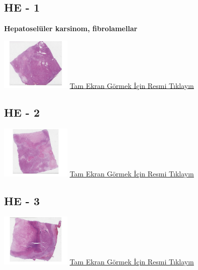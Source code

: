 \documentclass[
  letterpaper,
  DIV=11,
  numbers=noendperiod]{scrreprt}
\begin{document}
\hypertarget{he---1-1}{%
\subsection{HE - 1}\label{he---1-1}}

\textbf{Hepatoselüler karsinom, fibrolamellar}

\href{https://images.patolojiatlasi.com/fibrolamellar-hepatocellular-carcinoma/HE1.html}{\includegraphics[width=0.25\textwidth,height=\textheight]{./screenshots/fibrolamellar-hepatocellular-carcinoma-1_screenshot.png}}
\href{https://images.patolojiatlasi.com/fibrolamellar-hepatocellular-carcinoma/HE1.html}{Tam
Ekran Görmek İçin Resmi Tıklayın}

\hypertarget{he---2-1}{%
\subsection{HE - 2}\label{he---2-1}}

\href{https://images.patolojiatlasi.com/fibrolamellar-hepatocellular-carcinoma/HE2.html}{\includegraphics[width=0.25\textwidth,height=\textheight]{./screenshots/fibrolamellar-hepatocellular-carcinoma-2_screenshot.png}}
\href{https://images.patolojiatlasi.com/fibrolamellar-hepatocellular-carcinoma/HE2.html}{Tam
Ekran Görmek İçin Resmi Tıklayın}

\hypertarget{he---3-1}{%
\subsection{HE - 3}\label{he---3-1}}

\href{https://images.patolojiatlasi.com/fibrolamellar-hepatocellular-carcinoma/HE3.html}{\includegraphics[width=0.25\textwidth,height=\textheight]{./screenshots/fibrolamellar-hepatocellular-carcinoma-3_screenshot.png}}
\href{https://images.patolojiatlasi.com/fibrolamellar-hepatocellular-carcinoma/HE3.html}{Tam
Ekran Görmek İçin Resmi Tıklayın}
\end{document}
